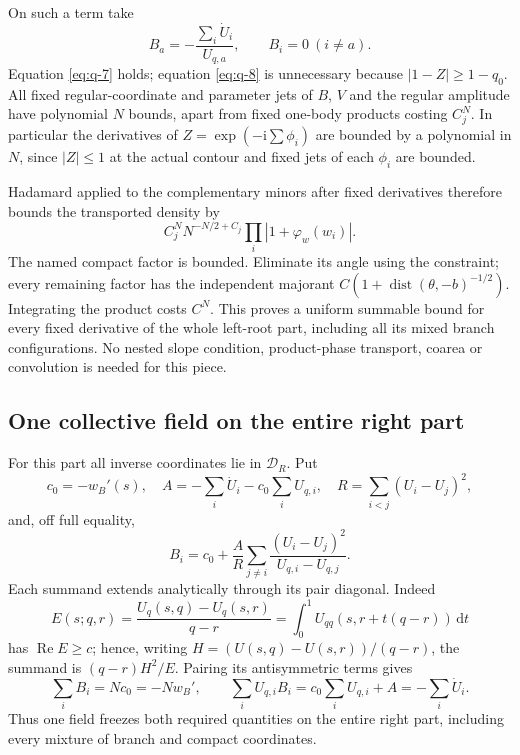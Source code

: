 \documentclass[11pt]{article}
\numberwithin{equation}{section}
\theoremstyle{remark}\newtheorem{remark}[theorem]{Remark}
\newcommand{\ii}{\mathrm i}
\newcommand{\dd}{\mathrm d}
\newcommand{\Rea}{\operatorname{Re}}
\begin{document}
On such a term take
\begin{equation}\label{eq:q-10}
B_a=-\frac{\sum_i\dot U_i}{U_{q,a}},\qquad B_i=0\ (i\ne a).
\end{equation}
Equation \eqref{eq:q-7} holds; equation \eqref{eq:q-8} is unnecessary because
$|1-Z|\ge1-q_0$. All fixed regular-coordinate and parameter jets of
$B$, $V$ and the regular amplitude have polynomial $N$ bounds, apart
from fixed one-body products costing $C_j^N$. In particular the
derivatives of $Z=\exp(-\ii\sum\phi_i)$ are bounded by a polynomial
in $N$, since $|Z|\le1$ at the actual contour and fixed jets of each
$\phi_i$ are bounded.

Hadamard applied to the complementary minors after fixed derivatives
therefore bounds the transported density by
\begin{equation}\label{eq:q-11}
C_j^N N^{-N/2+C_j}\prod_i |1+\varphi_w(w_i)|.
\end{equation}
The named compact factor is bounded. Eliminate its angle using the
constraint; every remaining factor has the independent majorant
$C(1+\operatorname{dist}(\theta,-b)^{-1/2})$. Integrating the product
costs $C^N$. This proves a uniform summable bound for every fixed
derivative of the whole left-root part, including all its mixed
branch configurations. No nested slope condition, product-phase
transport, coarea or convolution is needed for this piece.

\subsection{One collective field on the entire right part}\label{sec:right-field}

For this part all inverse coordinates lie in $\mathcal D_R$. Put
\[
 c_0=-w_B'(s),\quad
 A=-\sum_i\dot U_i-c_0\sum_iU_{q,i},\quad
 R=\sum_{i<j}(U_i-U_j)^2,
\]
and, off full equality,
\begin{equation}\label{eq:q-12}
B_i=c_0+\frac A R\sum_{j\ne i}
              \frac{(U_i-U_j)^2}{U_{q,i}-U_{q,j}}.
\end{equation}
Each summand extends analytically through its pair diagonal. Indeed
\[
 E(s;q,r)=\frac{U_q(s,q)-U_q(s,r)}{q-r}
         =\int_0^1U_{qq}(s,r+t(q-r))\,\dd t
\]
has $\Rea E\ge c$; hence, writing
$H=(U(s,q)-U(s,r))/(q-r)$, the summand is
$(q-r)H^2/E$. Pairing its antisymmetric terms gives
\begin{equation}\label{eq:q-13}
\sum_iB_i=Nc_0=-Nw_B',\qquad
 \sum_iU_{q,i}B_i=c_0\sum_iU_{q,i}+A=-\sum_i\dot U_i.
\end{equation}
Thus one field freezes both required quantities on the entire right
part, including every mixture of branch and compact coordinates.
\end{document}
